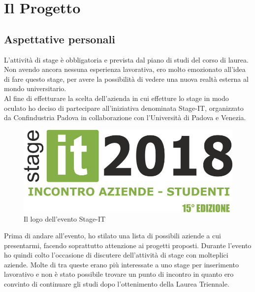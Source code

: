 
\chapter{Il Progetto}
\label{cap:progetto}


\section{Aspettative personali}
	L’attività di stage è obbligatoria e prevista dal piano di studi del corso di laurea.
	Non avendo ancora nessuna esperienza lavorativa, ero molto emozionato all’idea di fare questo stage, per avere la possibilità di vedere una nuova realtà esterna al mondo
	universitario. \\
	Al fine di effetturare la scelta dell'azienda in cui effetture lo stage in modo oculato ho
	deciso di partecipare all’iniziativa denominata Stage-IT, organizzato da Confindustria Padova in collaborazione con l’Università di Padova e
	Venezia.
	
	\begin{figure}[H]
		\centering
		\includegraphics[width=0.5\linewidth]{immagini/stageit2018}
		\caption{Il logo dell'evento Stage-IT}
		\label{fig:stagit}
	\end{figure}
	
	Prima di andare all’evento, ho stilato una lista di possibili aziende a cui presentarmi, facendo soprattutto attenzione ai progetti proposti. Durante l’evento ho quindi
	colto l’occasione di discutere dell’attività di stage con molteplici aziende. Molte di tra queste
	erano più interessate a uno stage per inserimento lavorativo e non è stato possibile trovare un punto di incontro in quanto ero convinto di continuare gli studi dopo l'ottenimento della Laurea Triennale.\\ \\
	
